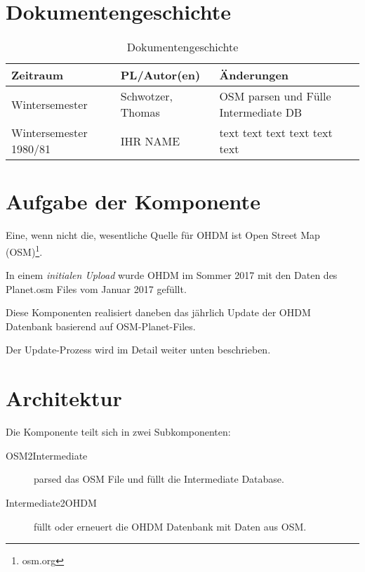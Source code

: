 \section{Dokumentengeschichte}
\begin{table}[h]
 \begin{tabular}{|l|l|p{4cm}|}
 \hline
 Zeitraum & PL/Autor(en) & Änderungen \\
 \hline
 Wintersemester & Schwotzer, Thomas & 
OSM parsen und Fülle Intermediate DB
   \\
 \hline
 Wintersemester 1980/81 & IHR NAME & 
text \newline 
text \newline 
text \newline 
text \newline 
text \newline 
text \newline 
 
  \\
 \hline
 \end{tabular}
 \caption{Dokumentengeschichte}
 \end{table}

\section{Aufgabe der Komponente}
Eine, wenn nicht die, wesentliche Quelle für OHDM ist Open Street 
Map (OSM)\footnote{osm.org}.

In einem {\it initialen Upload} wurde OHDM im Sommer 2017 mit
den Daten des Planet.osm Files vom Januar 2017 gefüllt.

Diese Komponenten realisiert daneben das jährlich Update der
OHDM Datenbank basierend auf OSM-Planet-Files.

Der Update-Prozess wird im Detail weiter unten beschrieben.

\section{Architektur}
Die Komponente teilt sich in zwei Subkomponenten:

\begin{description}
\item[OSM2Intermediate] 
parsed das OSM File und füllt die
Intermediate Database.

\item[Intermediate2OHDM] füllt oder erneuert die OHDM Datenbank 
mit Daten aus OSM.

\end{description}

